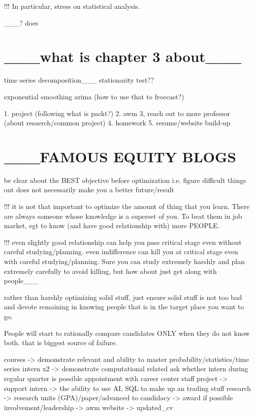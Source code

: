 {{{{{{{{{{!!! In particular, stress on statistical analysis.

___? does 

\section*{___what is chapter 3 about___}
time series decomposition___
stationarity test??

exponential smoothing
arima
(how to use that to froecast?)

1. project (following what is packt?)
2. awm 
3, reach out to more professor (about resaerch/common project)
4. homework
5. resume/website build-up

\section*{___FAMOUS EQUITY BLOGS}

be clear about the BEST objective before optimization
i.e. figure difficult things out does not  necessarily make you a better future/result

!!! it is not that important to optimize the amount of thing that you learn. There are always someone whose knowledge is a superset of you. To beat them in job market, egt to know (and have good relationship with) more PEOPLE.

!!! even slightly good relationship can help you pass critical stage even without careful studying/planning. even indifference can kill you at critical stage even with careful studying/planning. Sure you can study extremely harshly and plan extremely carefully to avoid killing, but how about just get along with people___

rather than harshly optimizing solid stuff, just ensure solid stuff is not too bad and devote remaining in knowing people that is in the target place you want to go.

People will start to rationally compare candidates ONLY when they do not know both. that is biggest source of failure.

courses -> demonstrate relevant and ability to master
	probability/statistics/time series
intern x2 -> demonstrate computational related
	ask whether intern during regular quarter is possible
	appointment with career center staff
project -> support intern
		-> the ability to use AI, SQL to make up an trading stuff
research -> research units (GPA)/paper/advanced to candidacy -> award if possible
involvement/leadership -> awm
website -> updated_cv

}}}}}}}}}}

